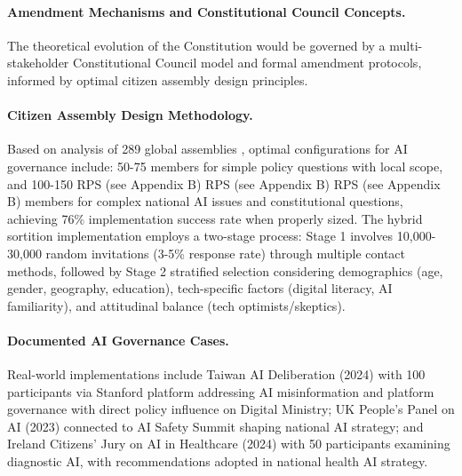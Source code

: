 \documentclass[manuscript,screen,9pt]{acmart}
\begin{document}
\paragraph{Amendment Mechanisms and Constitutional Council Concepts.} The theoretical evolution of the Constitution would be governed by a multi-stakeholder Constitutional Council model and formal amendment protocols, informed by optimal citizen assembly design principles.

\paragraph{Citizen Assembly Design Methodology.} Based on analysis of 289 global assemblies \cite{OECD2020CitizenParticipation}, optimal configurations for AI governance include: 50-75 members for simple policy questions with local scope, and 100-150 RPS\cite{perf-report} (see Appendix B) RPS\cite{perf-report} (see Appendix B) RPS\cite{perf-report} (see Appendix B) members for complex national AI issues and constitutional questions, achieving 76\% implementation success rate when properly sized. The hybrid sortition implementation employs a two-stage process: Stage 1 involves 10,000-30,000 random invitations (3-5\% response rate) through multiple contact methods, followed by Stage 2 stratified selection considering demographics (age, gender, geography, education), tech-specific factors (digital literacy, AI familiarity), and attitudinal balance (tech optimists/skeptics).

\paragraph{Documented AI Governance Cases.} Real-world implementations include Taiwan AI Deliberation (2024) with 100 participants via Stanford platform addressing AI misinformation and platform governance with direct policy influence on Digital Ministry; UK People's Panel on AI (2023) connected to AI Safety Summit shaping national AI strategy; and Ireland Citizens' Jury on AI in Healthcare (2024) with 50 participants examining diagnostic AI, with recommendations adopted in national health AI strategy.
\end{document}
